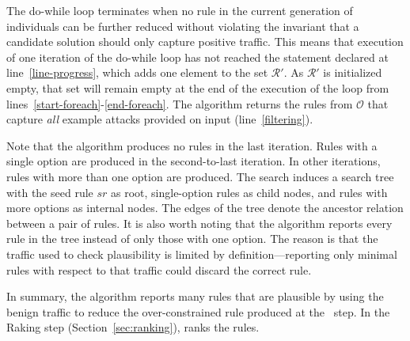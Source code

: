 \documentclass[conference]{IEEEtran}
\begin{document}
The do-while loop terminates when no rule in the current generation of
individuals can be further reduced without violating the invariant
that a candidate solution should only capture positive traffic. This
means that execution of one iteration of the do-while loop has not
reached the statement declared at line~\ref{line-progress}, which adds
one element to the set $\mathcal{R'}$. As $\mathcal{R'}$ is
initialized empty, that set will remain empty at the end of the
execution of the loop from
lines~\ref{start-foreach}-\ref{end-foreach}. The algorithm returns the
rules from $\mathcal O$ that capture \emph{all} example attacks
provided on input (line~\ref{filtering}).

Note that the algorithm produces no rules in the last iteration. Rules
with a single option are produced in the second-to-last iteration. In
other iterations, rules with more than one option are produced. The
search induces a search tree with the seed rule $sr$ as root,
single-option rules as child nodes, and rules with more options as
internal nodes. The edges of the tree denote the ancestor relation
between a pair of rules. It is also worth noting that the algorithm
reports every rule in the tree instead of only those with one
option. The reason is that the traffic used to check plausibility is
limited by definition---reporting only minimal rules with respect to
that traffic could discard the correct rule.

In summary, the algorithm reports many rules that are plausible by
using the benign traffic to reduce the over-constrained rule produced
at the \reveng\ step. In the Raking step (Section~\ref{sec:ranking}),
\tname{} ranks the rules.


\end{document}
